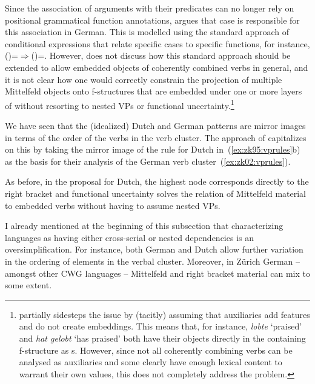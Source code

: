 \documentclass[output=paper,hidelinks]{langscibook}
\begin{document}
%
Since the association of arguments with their predicates can no longer
rely on positional grammatical function annotations,
\citet{Berman2003} argues that case is responsible for this
association in German. This is modelled using the standard approach of
conditional expressions that relate specific cases to specific
functions, for instance,
(\DOWN\CASE)=\ACC$\Rightarrow$(\UP\OBJ)=\DOWN. 
However, \citeauthor{Berman2003} does not discuss how this standard
approach should be extended to allow embedded objects of coherently
combined verbs in general, and it is not clear how one would correctly
constrain the projection of multiple Mittelfeld objects onto f-structures that
are embedded under one or more layers of \XCOMP{} without resorting
to nested VPs or functional uncertainty.\footnote{\citet{Berman2003}
partially sidesteps the issue by (tacitly) assuming that auxiliaries
add features and do not create \XCOMP embeddings. This means that, for
instance, \textit{lobte} `praised' and \textit{hat gelobt} `has
praised' both have their objects directly in the containing
f-structure as \OBJ{}s. However, since not all coherently combining
verbs can be analysed as auxiliaries and some clearly have enough
lexical content to warrant their own \PRED values, this does not
completely address the problem.}

We have seen that the (idealized) Dutch and German patterns are mirror images
in terms of the order of the verbs in the verb cluster. The approach
of \citet{ZaenenKaplan2002:Subsumption} capitalizes on this by taking
the mirror image of the  rule for Dutch in~(\ref{ex:zk95:vprules}b) as
the basis for their analysis of the German verb cluster~(\ref{ex:zk02:vprules}).
%
\begin{exe}
    \ex \label{ex:zk02:vprules}
\end{exe}
%
As before, in the proposal for Dutch, the highest  node
corresponds directly to the right bracket and functional uncertainty
solves the relation of Mittelfeld material to embedded verbs without
having to assume nested VPs.

 I already mentioned at the beginning of this subsection that
characterizing languages as having either cross-serial or nested
dependencies is an oversimplification. For instance, both German and
Dutch allow further variation in the ordering of elements in the
verbal cluster. Moreover, in Zürich German -- amongst other CWG languages --
Mittelfeld and right bracket material can mix to some extent.\largerpage[-1]
\end{document}

